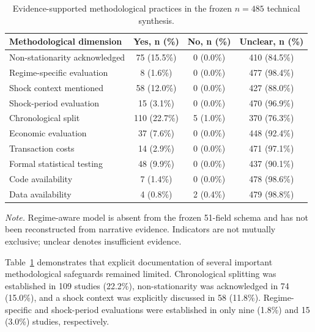 \documentclass[pdflatex,sn-mathphys-num]{sn-jnl}%
\theoremstyle{thmstyleone}%
\theoremstyle{thmstyletwo}%
\theoremstyle{thmstylethree}%
\begin{document}
\begin{table}[!htbp]
\centering
\caption{Evidence-supported methodological practices in the frozen $n=485$ technical synthesis.}
\label{tab:methodological-practices}
\small
\setlength{\tabcolsep}{4pt}
\renewcommand{\arraystretch}{1.12}
\begin{tabular}{lccc}
\toprule
Methodological dimension & Yes, n (\%) & No, n (\%) & Unclear, n (\%) \\
\midrule
Non-stationarity acknowledged & 75 (15.5\%) & 0 (0.0\%) & 410 (84.5\%) \\
Regime-specific evaluation & 8 (1.6\%) & 0 (0.0\%) & 477 (98.4\%) \\
Shock context mentioned & 58 (12.0\%) & 0 (0.0\%) & 427 (88.0\%) \\
Shock-period evaluation & 15 (3.1\%) & 0 (0.0\%) & 470 (96.9\%) \\
Chronological split & 110 (22.7\%) & 5 (1.0\%) & 370 (76.3\%) \\
Economic evaluation & 37 (7.6\%) & 0 (0.0\%) & 448 (92.4\%) \\
Transaction costs & 14 (2.9\%) & 0 (0.0\%) & 471 (97.1\%) \\
Formal statistical testing & 48 (9.9\%) & 0 (0.0\%) & 437 (90.1\%) \\
Code availability & 7 (1.4\%) & 0 (0.0\%) & 478 (98.6\%) \\
Data availability & 4 (0.8\%) & 2 (0.4\%) & 479 (98.8\%) \\
\bottomrule
\end{tabular}

\vspace{1mm}
\begin{minipage}{0.97\linewidth}
\footnotesize
\textit{Note.} Regime-aware model is absent from the frozen 51-field schema and has not been reconstructed from narrative evidence. Indicators are not mutually exclusive; unclear denotes insufficient evidence.
\end{minipage}
\end{table}

\FloatBarrier

Table~\ref{tab:methodological-practices} demonstrates that explicit
documentation of several important methodological safeguards remained
limited. Chronological splitting was established in 109 studies (22.2\%),
non-stationarity was acknowledged in 74 (15.0\%), and a shock context was
explicitly discussed in 58 (11.8\%). Regime-specific and shock-period
evaluations were established in only nine (1.8\%) and 15 (3.0\%) studies,
respectively.
\end{document}

